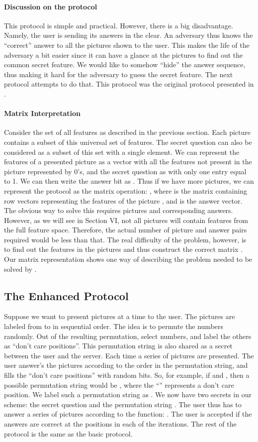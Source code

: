 \documentclass{llncs}
\begin{document}
\paragraph*{Discussion on the protocol} This protocol is simple and practical. However, there is a big disadvantage. Namely, the user is sending its answers in the clear. An adversary thus knows the ``correct'' answer to all the pictures shown to the user. This makes the life of the adversary a bit easier since it can have a glance at the pictures to find out the common secret feature. We would like to somehow ``hide'' the answer sequence, thus making it hard for the adversary to guess the secret feature. The next protocol attempts to do that. This protocol was the original protocol presented in \cite{hassan}.
\paragraph*{Matrix Interpretation}Consider the set of all features  as described in the previous section. Each picture contains a subset of this universal set of features. The secret question can also be considered as a subset of this set with a single element. We can represent the features of a presented picture  as a vector  with all the features not present in the picture represented by 0's, and the secret question as  with only one entry equal to 1. We can then write the answer bit as . Thus if we have more pictures, we can represent the protocol as the matrix operation: , where  is the matrix containing row vectors  representing the features of the picture , and  is the answer vector. The obvious way to solve this requires  pictures and corresponding answers. However, as we will see in Section VI, not all pictures will contain features from the full feature space. Therefore, the actual number of picture and answer pairs required would be less than that. The real difficulty of the problem, however, is to find out the features in the pictures and thus construct the correct matrix . Our matrix representation shows one way of describing the problem needed to be solved by .
\subsection{The Enhanced Protocol} 
Suppose we want to present  pictures at a time to the user. The pictures are labeled from  to  in sequential order. The idea is to permute the numbers randomly. Out of the resulting permutation, select  numbers, and label the others as ``don't care positions''. This permutation string is also shared as a secret between the user and the server. Each time a series of  pictures are presented. The user answer's the pictures according to the order in the permutation string, and fills the ``don't care positions'' with random bits. So, for example, if  and , then a possible permutation string would be , where the ``'' represents a don't care position. We label such a permutation string as . We now have two secrets in our scheme: the secret question  and the permutation string . The user thus has to answer a series of pictures according to the function: . The user is accepted if the answers are correct at the  positions in each of the  iterations. The rest of the protocol is the same as the basic protocol.
\end{document}
